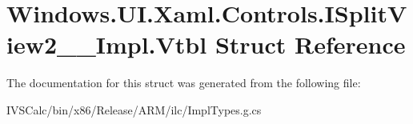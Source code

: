 \hypertarget{struct_windows_1_1_u_i_1_1_xaml_1_1_controls_1_1_i_split_view2_____impl_1_1_vtbl}{}\section{Windows.\+U\+I.\+Xaml.\+Controls.\+I\+Split\+View2\+\_\+\+\_\+\+Impl.\+Vtbl Struct Reference}
\label{struct_windows_1_1_u_i_1_1_xaml_1_1_controls_1_1_i_split_view2_____impl_1_1_vtbl}


The documentation for this struct was generated from the following file\+:\begin{DoxyCompactItemize}
\item 
I\+V\+S\+Calc/bin/x86/\+Release/\+A\+R\+M/ilc/Impl\+Types.\+g.\+cs\end{DoxyCompactItemize}
